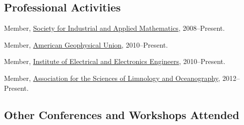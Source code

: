 \documentclass[10pt,letterpaper]{article}
\renewenvironment{itemize}{
  \begin{list}{}{
    \setlength{\leftmargin}{1.5em}
    \setlength{\itemsep}{0.25em}
    \setlength{\parskip}{0pt}
    \setlength{\parsep}{0.25em}
  }
}{
  \end{list}
}
\begin{document}
\subsection*{Professional Activities}

\begin{itemize}

\item Member, \href{http://www.siam.org/}{Society for Industrial and Applied Mathematics},
  2008--Present.

\item Member, \href{http://www.agu.org/}{American Geophysical Union},
  2010--Present.

\item Member, \href{http://www.ieee.org/}{Institute of Electrical and Electronics Engineers},
  2010--Present.

\item Member, \href{http://www.aslo.org/}{Association for the Sciences of Limnology and Oceanography},
  2012--Present.

%

\end{itemize}

\subsection*{Other Conferences and Workshops Attended}
\end{document}
